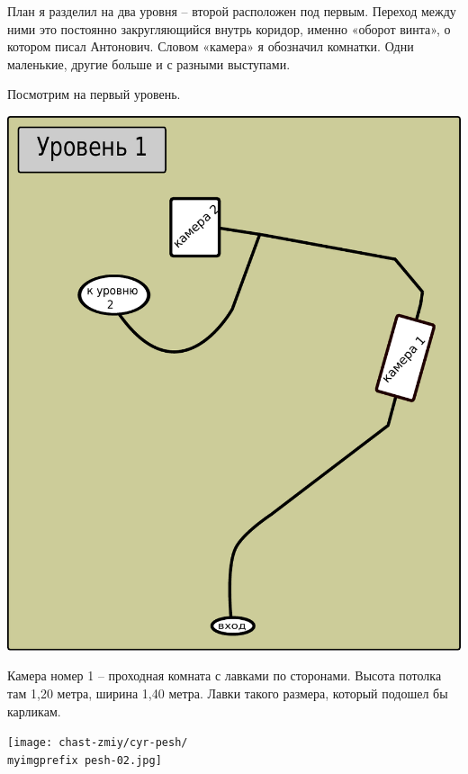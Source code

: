 План я разделил на два уровня – второй расположен под первым. Переход между ними это постоянно закругляющийся внутрь коридор, именно «оборот винта», о котором писал Антонович. Словом «камера» я обозначил комнатки. Одни маленькие, другие больше и с разными выступами.

Посмотрим на первый уровень.

\vspace*{\fill}
\begin{center}
\includegraphics[width=\linewidth]{chast-zmiy/cyr-pesh/kirill-peshera-plan-level-01.pdf}
\end{center}

\vspace*{\fill}
\newpage
Камера номер 1 – проходная комната с лавками по сторонами. Высота потолка там 1,20 метра, ширина 1,40 метра. Лавки такого размера, который подошел бы карликам. 

\begin{center}
\texttt{[image: chast-zmiy/cyr-pesh/\\myimgprefix pesh-02.jpg]}
\end{center}

